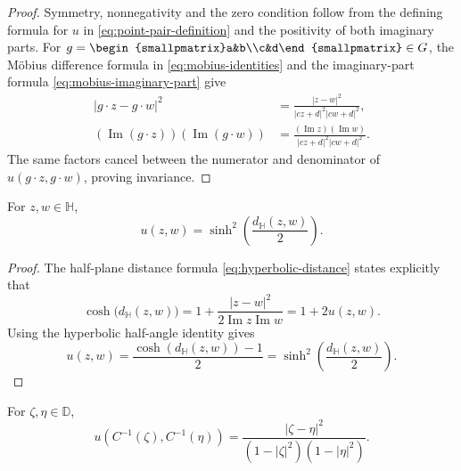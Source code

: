 \begin{proof}
Symmetry, nonnegativity and the zero condition follow from the defining formula for $u$ in \eqref{eq:point-pair-definition} and the positivity of both imaginary parts. For $g=\begin{smallpmatrix}a&b\\c&d\end{smallpmatrix}\in G$, the Möbius difference formula in \eqref{eq:mobius-identities} and the imaginary-part formula \eqref{eq:mobius-imaginary-part} give
\[
 \begin{aligned}
 |g\cdot z-g\cdot w|^2
 &=\frac{|z-w|^2}{|cz+d|^2|cw+d|^2},\\
 (\operatorname{Im}(g\cdot z))(\operatorname{Im}(g\cdot w))
 &=\frac{(\operatorname{Im}z)(\operatorname{Im}w)}{|cz+d|^2|cw+d|^2}.
 \end{aligned}
\]
The same factors cancel between the numerator and denominator of $u(g\cdot z,g\cdot w)$, proving invariance.
\end{proof}

\begin{corollary}\label{hyperbolic.point-pair-distance}
For $z,w\in\mathbb H$,
\begin{equation}\label{eq:point-pair-distance}
 u(z,w)=\sinh^2\!\left(\frac{d_{\mathbb H}(z,w)}2\right).
\end{equation}
\end{corollary}

\begin{proof}
The half-plane distance formula \eqref{eq:hyperbolic-distance} states explicitly that
\[
 \cosh\bigl(d_{\mathbb H}(z,w)\bigr)
 =1+\frac{|z-w|^2}{2\operatorname{Im}z\operatorname{Im}w}
 =1+2u(z,w).
\]
Using the hyperbolic half-angle identity gives
\[
 u(z,w)=\frac{\cosh(d_{\mathbb H}(z,w))-1}{2}
       =\sinh^2\!\left(\frac{d_{\mathbb H}(z,w)}2\right).
\]
\end{proof}

\begin{proposition}\label{hyperbolic.point-pair-disk}
For $\zeta,\eta\in\mathbb D$,
\begin{equation}\label{eq:point-pair-disk}
 u(C^{-1}(\zeta),C^{-1}(\eta))
 =\frac{|\zeta-\eta|^2}{(1-|\zeta|^2)(1-|\eta|^2)}.
\end{equation}
\end{proposition}

